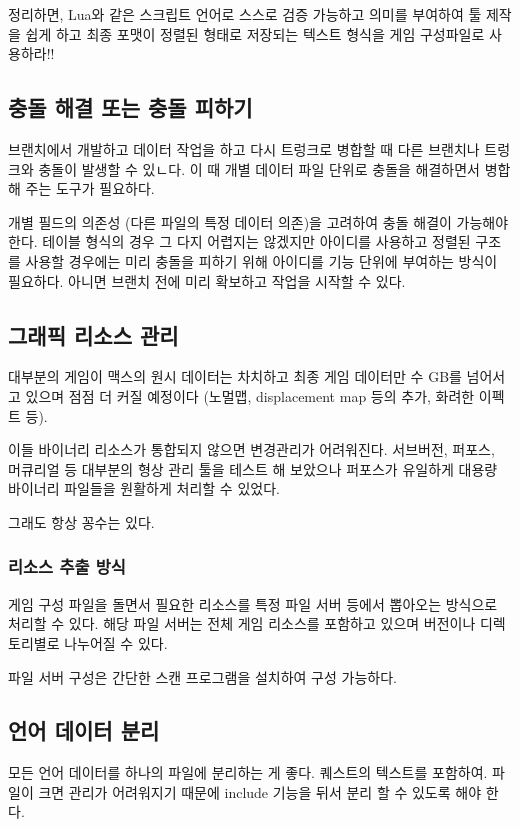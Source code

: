 \documentclass[chapter,kosection, 10.5pt, romanfixed, a4paper]{oblivoir}
\begin{document}
정리하면, Lua와 같은 스크립트 언어로 스스로 검증 가능하고 의미를 부여하여 툴 제작을 쉽게 하고 
최종 포맷이 정렬된 형태로 저장되는 텍스트 형식을 게임 구성파일로 사용하라!!

\subsection{충돌 해결 또는 충돌 피하기}

브랜치에서 개발하고 데이터 작업을 하고 다시 트렁크로 병합할 때 다른 브랜치나 트렁크와 
충돌이 발생할 수 있ㄴ다. 이 때 개별 데이터 파일 단위로 충돌을 해결하면서 병합해 주는 도구가 필요하다. 

개별 필드의 의존성 (다른 파일의 특정 데이터 의존)을 고려하여 충돌 해결이 가능해야 한다. 
테이블 형식의 경우 그 다지 어렵지는 않겠지만 아이디를 사용하고 정렬된 구조를 사용할 경우에는
미리 충돌을 피하기 위해 아이디를 기능 단위에 부여하는 방식이 필요하다. 아니면 브랜치 전에 
미리 확보하고 작업을 시작할 수 있다. 


\subsection{그래픽 리소스 관리}

대부분의 게임이 맥스의 원시 데이터는 차치하고 최종 게임 데이터만 수 GB를 넘어서고 있으며 점점 더 
커질 예정이다 (노멀맵, displacement map 등의 추가, 화려한 이펙트 등). 

이들 바이너리 리소스가 통합되지 않으면 변경관리가 어려워진다. 서브버전, 퍼포스, 머큐리얼 등
대부분의 형상 관리 툴을 테스트 해 보았으나 퍼포스가 유일하게 대용량 바이너리 파일들을 원활하게 
처리할 수 있었다. 

그래도 항상 꽁수는 있다. 

\subsubsection{리소스 추출 방식}

게임 구성 파일을 돌면서 필요한 리소스를 특정 파일 서버 등에서 뽑아오는 방식으로 처리할 수 있다. 
해당 파일 서버는 전체 게임 리소스를 포함하고 있으며 버전이나 디렉토리별로 나누어질 수 있다. 

파일 서버 구성은 간단한 스캔 프로그램을 설치하여 구성 가능하다. 

\subsection{언어 데이터 분리}

모든 언어 데이터를 하나의 파일에 분리하는 게 좋다. 퀘스트의 텍스트를 포함하여. 
파일이 크면 관리가 어려워지기 때문에 include 기능을 뒤서 분리 할 수 있도록 해야 한다. 
\end{document}
